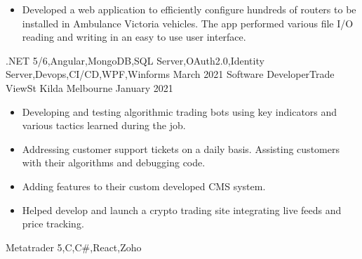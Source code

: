 \begin{experiences}
{\begin{itemize}
                        \item Developed a web application to efficiently configure hundreds of routers to be installed in Ambulance Victoria vehicles. The app performed various file I/O reading and writing in an easy to use user interface.
                      \end{itemize}
                    }
                    {.NET 5/6,Angular,MongoDB,SQL Server,OAuth2.0,Identity Server,Devops,CI/CD,WPF,Winforms}
  \emptySeparator
  \experience
    {March 2021}     {Software Developer}{Trade View}{St Kilda Melbourne}
    {January 2021}    {
                      \begin{itemize}
                        \item Developing and testing algorithmic trading bots using key indicators and various tactics learned during the job.
                        \item Addressing customer support tickets on a daily basis. Assisting customers with their algorithms and debugging code.
                        \item Adding features to their custom developed CMS system.
                        \item Helped develop and launch a crypto trading site integrating live feeds and price tracking. 
                      \end{itemize}
                    }
                    {Metatrader 5,C,C\#,React,Zoho}
  \emptySeparator
\end{experiences}
